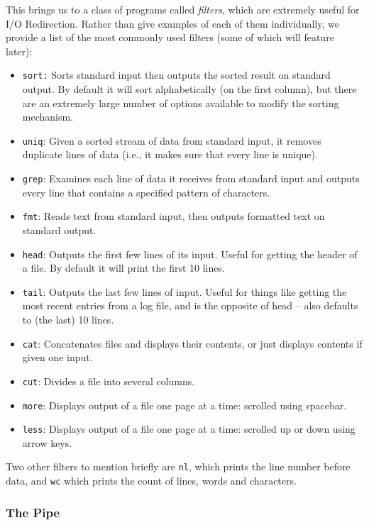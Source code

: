 \documentclass[11pt]{article}
\begin{document}
This brings us to a class of programs called \emph{filters}, which are extremely useful for I/O Redirection. Rather than give examples of each of them individually, we provide a list of the most commonly used filters (some of which will feature later):

\begin{itemize} 
\item \texttt{sort:} Sorts standard input then outputs the sorted result on standard output. By default it will sort alphabetically (on the first column), but there are an extremely large number of options available to modify the sorting mechanism.
\item \texttt{uniq}: Given a sorted stream of data from standard input, it removes duplicate lines of data (i.e., it makes sure that every line is unique).
\item \texttt{grep}: Examines each line of data it receives from standard input and outputs every line that contains a specified pattern of characters.
\item \texttt{fmt}: Reads text from standard input, then outputs formatted text on standard output.
\item \texttt{head}: Outputs the first few lines of its input. Useful for getting the header of a file. By default it will print the first 10 lines.
\item \texttt{tail}: Outputs the last few lines of input. Useful for things like getting the most recent entries from a log file, and is the opposite of head -- also defaults to (the last) 10 lines.
\item \texttt{cat}: Concatenates files and displays their contents, or just displays contents if given one input.
\item \texttt{cut}: Divides a file into several columns.
\item \texttt{more}: Displays output of a file one page at a time: scrolled using spacebar.
\item \texttt{less}: Displays output of a file one page at a time: scrolled up or down using arrow keys.
\end{itemize}

Two other filters to mention briefly are \texttt{nl}, which prints the line number before data, and \texttt{wc} which prints the count of lines, words and characters.

\subsubsection{The Pipe}
\end{document}
